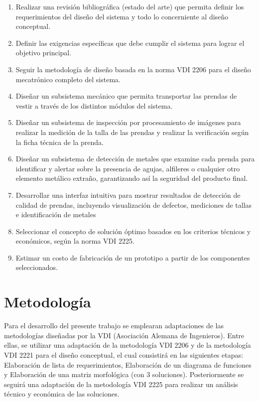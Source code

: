 \begin{enumerate}
	\setlength\itemsep{-0.5em}
	\item Realizar una revisión bibliográfica (estado del arte) que permita definir los requerimientos del diseño del sistema y todo lo concerniente al diseño conceptual.
	
	\item Definir las exigencias específicas que debe cumplir el sistema para lograr el objetivo principal.
	
	\item Seguir la metodología de diseño basada en la norma VDI 2206 para el diseño mecatrónico completo del sistema.
	
	\item Diseñar un subsistema mecánico que permita transportar las prendas de vestir a través de los distintos módulos del sistema.
	
	\item Diseñar un subsistema de inspección por procesamiento de imágenes para realizar la medición de la talla de las prendas y realizar la verificación según la ficha técnica de la prenda.
	
	\item Diseñar un subsistema de detección de metales que examine cada prenda para identificar y alertar sobre la presencia de agujas, alfileres o cualquier otro elemento metálico extraño, garantizando así la seguridad del producto final.
	
	\item Desarrollar una interfaz intuitiva para mostrar resultados de detección de calidad de prendas, incluyendo visualización de defectos, mediciones de tallas e identificación de metales
	
	\item Seleccionar el concepto de solución óptimo basados en los criterios técnicos y económicos, según la norma VDI 2225.
	
	\item Estimar un costo de fabricación de un prototipo a partir de los componentes seleccionados.
	
	\label{lst:objetivos_especificos}
\end{enumerate}

\section{Metodología}

Para el desarrollo del presente trabajo se emplearan adaptaciones de las metodologías diseñadas por la VDI (Asociación Alemana de Ingenieros). Entre ellas, se utilizar una adaptación de la metodología VDI 2206 \cite{VDIVDE2206_2021} y de la metodología VDI 2221 \cite{VDI2221_2019} para el diseño conceptual, el cual consistirá en las siguientes etapas: Elaboración de lista de requerimientos, Elaboración de un diagrama de funciones y Elaboración de una matriz morfológica (con 3 soluciones). Posteriormente se seguirá una adaptación de la metodología VDI 2225 \cite{VDI2225_series} para realizar un análisis técnico y económica de las soluciones.

